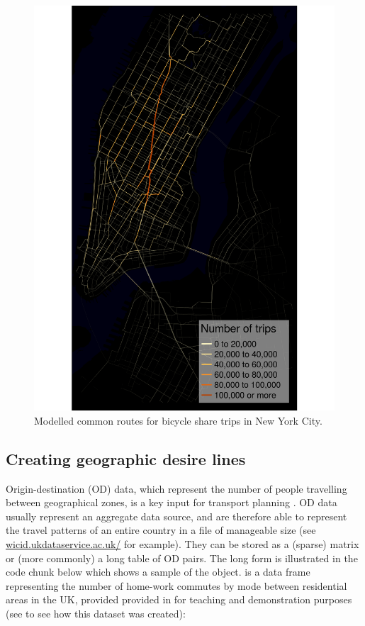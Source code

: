 \begin{figure}

{\centering \includegraphics[width=0.55\linewidth]{nyc-bicycle-data}

}

\caption{Modelled common routes for bicycle share trips in New York City.}\label{fig:nyc-bicycle-data}
\end{figure}

\subsection{Creating geographic desire
lines}\label{creating-geographic-desire-lines}

Origin-destination (OD) data, which represent the number of people travelling between
geographical zones, is a key input for transport planning \citep{calabrese_estimating_2011}.
OD data usually represent an aggregate data source, and are therefore able to represent the
travel patterns of an entire country in a file of manageable size
(see \href{http://wicid.ukdataservice.ac.uk/}{wicid.ukdataservice.ac.uk/} for example).
They can be stored as a (sparse) matrix or (more commonly) a long table of OD pairs.
The long form is illustrated in the code chunk below which shows a sample of
the  object.
 is a data frame representing the number
of home-work commutes by mode between residential
areas in the UK, provided provided in 
for teaching and demonstration purposes
(see  to see how this dataset was created):

